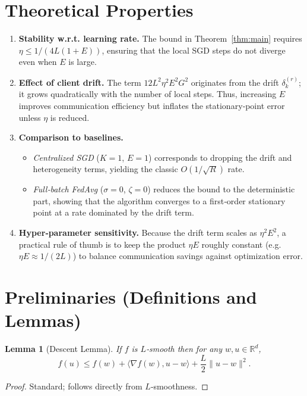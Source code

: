 \documentclass{article}
\newtheorem{lemma}{Lemma}
\newcommand{\R}{\mathbb{R}}
\begin{document}
\section*{Theoretical Properties}
\begin{enumerate}[label=\arabic*)]
\item \textbf{Stability w.r.t. learning rate.}
The bound in Theorem~\ref{thm:main} requires $\eta\le 1/(4L(1+E))$,
ensuring that the local SGD steps do not diverge even when $E$ is large.
\item \textbf{Effect of client drift.}
The term $12L^2\eta^2E^2G^2$ originates from the drift
$\delta_k^{(r)}$; it grows quadratically with the number of local steps.
Thus, increasing $E$ improves communication efficiency but
inflates the stationary‑point error unless $\eta$ is reduced.
\item \textbf{Comparison to baselines.}
\begin{itemize}
\item \emph{Centralized SGD} ($K=1$, $E=1$) corresponds to dropping the
drift and heterogeneity terms, yielding the classic $O(1/\sqrt{R})$
rate.
\item \emph{Full‑batch FedAvg} ($\sigma=0$, $\zeta=0$) reduces the bound to
the deterministic part, showing that the algorithm converges to a
first‑order stationary point at a rate dominated by the drift term.
\end{itemize}
\item \textbf{Hyper‑parameter sensitivity.}
Because the drift term scales as $\eta^2E^2$, a practical rule of thumb is
to keep the product $\eta E$ roughly constant (e.g. $\eta E\approx
1/(2L)$) to balance communication savings against optimization error.
\end{enumerate}

\section*{Preliminaries (Definitions and Lemmas)}
\begin{lemma}[Descent Lemma]\label{lem:descent}
If $f$ is $L$‑smooth then for any $w,u\in\R^d$,
\[
f(u)\le f(w)+\langle\nabla f(w),u-w\rangle+\frac{L}{2}\|u-w\|^2 .
\]
\end{lemma}
\begin{proof}
Standard; follows directly from $L$‑smoothness. \hfill\qedhere
\end{proof}
\end{document}

